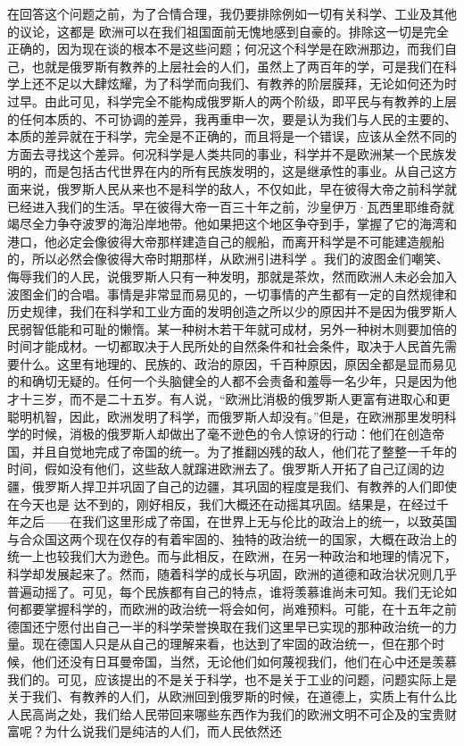 \documentclass{article}
\begin{document}
在回答这个问题之前，为了合情合理，我仍要排除例如一切有关科学、工业及其他的议论，这都是
\newpage
欧洲可以在我们祖国面前无愧地感到自豪的。排除这一切是完全正确的，因为现在谈的根本不是这些问题；何况这个科学是在欧洲那边，而我们自己，也就是俄罗斯有教养的上层社会的人们，虽然上了两百年的学，可是我们在科学上还不足以大肆炫耀，为了科学而向我们、有教养的阶层膜拜，无论如何还为时过早。由此可见，科学完全不能构成俄罗斯人的两个阶级，即平民与有教养的上层的任何本质的、不可协调的差异，我再重申一次，要是认为我们与人民的主要的、本质的差异就在于科学，完全是不正确的，而且将是一个错误，应该从全然不同的方面去寻找这个差异。何况科学是人类共同的事业，科学并不是欧洲某一个民族发明的，而是包括古代世界在内的所有民族发明的，这是继承性的事业。从自己这方面来说，俄罗斯人民从来也不是科学的敌人，不仅如此，早在彼得大帝之前科学就已经进入我们的生活。早在彼得大帝一百三十年之前，沙皇伊万·瓦西里耶维奇就竭尽全力争夺波罗的海沿岸地带。他如果把这个地区争夺到手，掌握了它的海湾和港口，他必定会像彼得大帝那样建造自己的舰船，而离开科学是不可能建造舰船的，所以必然会像彼得大帝时期那样，从欧洲引进科学
\newpage
。我们的波图金们嘲笑、侮辱我们的人民，说俄罗斯人只有一种发明，那就是茶炊，然而欧洲人未必会加入波图金们的合唱。事情是非常显而易见的，一切事情的产生都有一定的自然规律和历史规律，我们在科学和工业方面的发明创造之所以少的原因并不是因为俄罗斯人民弱智低能和可耻的懒惰。某一种树木若干年就可成材，另外一种树木则要加倍的时间才能成材。一切都取决于人民所处的自然条件和社会条件，取决于人民首先需要什么。这里有地理的、民族的、政治的原因，千百种原因，原因全都是显而易见的和确切无疑的。任何一个头脑健全的人都不会责备和羞辱一名少年，只是因为他才十三岁，而不是二十五岁。有人说，“欧洲比消极的俄罗斯人更富有进取心和更聪明机智，因此，欧洲发明了科学，而俄罗斯人却没有。”但是，在欧洲那里发明科学的时候，消极的俄罗斯人却做出了毫不逊色的令人惊讶的行动：他们在创造帝国，并且自觉地完成了帝国的统一。为了推翻凶残的敌人，他们花了整整一千年的时间，假如没有他们，这些敌人就蹿进欧洲去了。俄罗斯人开拓了自己辽阔的边疆，俄罗斯人捍卫并巩固了自己的边疆，其巩固的程度是我们、有教养的人们即使在今天也是
\newpage
达不到的，刚好相反，我们大概还在动摇其巩固。结果是，在经过千年之后——在我们这里形成了帝国，在世界上无与伦比的政治上的统一，以致英国与合众国这两个现在仅存的有着牢固的、独特的政治统一的国家，大概在政治上的统一上也较我们大为逊色。而与此相反，在欧洲，在另一种政治和地理的情况下，科学却发展起来了。然而，随着科学的成长与巩固，欧洲的道德和政治状况则几乎普遍动摇了。可见，每个民族都有自己的特点，谁将羡慕谁尚未可知。我们无论如何都要掌握科学的，而欧洲的政治统一将会如何，尚难预料。可能，在十五年之前德国还宁愿付出自己一半的科学荣誉换取在我们这里早已实现的那种政治统一的力量。现在德国人只是从自己的理解来看，也达到了牢固的政治统一，但在那个时候，他们还没有日耳曼帝国，当然，无论他们如何蔑视我们，他们在心中还是羡慕我们的。可见，应该提出的不是关于科学，也不是关于工业的问题，问题实际上是关于我们、有教养的人们，从欧洲回到俄罗斯的时候，在道德上，实质上有什么比人民高尚之处，我们给人民带回来哪些东西作为我们的欧洲文明不可企及的宝贵财富呢？为什么说我们是纯洁的人们，而人民依然还
\end{document}
